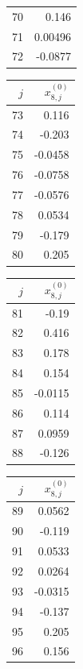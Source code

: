 {\begin{tabular}[t]{r|r}
70 & 0.146 \\
71 & 0.00496 \\
72 & -0.0877
\end{tabular}\kern4pt
\begin{tabular}[t]{r|r}
$j$ & $x^{(0)}_{8,j}$ \\\hline
73 & 0.116 \\
74 & -0.203 \\
75 & -0.0458 \\
76 & -0.0758 \\
77 & -0.0576 \\
78 & 0.0534 \\
79 & -0.179 \\
80 & 0.205
\end{tabular}\kern4pt
\begin{tabular}[t]{r|r}
$j$ & $x^{(0)}_{8,j}$ \\\hline
81 & -0.19 \\
82 & 0.416 \\
83 & 0.178 \\
84 & 0.154 \\
85 & -0.0115 \\
86 & 0.114 \\
87 & 0.0959 \\
88 & -0.126
\end{tabular}\kern4pt
\begin{tabular}[t]{r|r}
$j$ & $x^{(0)}_{8,j}$ \\\hline
89 & 0.0562 \\
90 & -0.119 \\
91 & 0.0533 \\
92 & 0.0264 \\
93 & -0.0315 \\
94 & -0.137 \\
95 & 0.205 \\
96 & 0.156
\end{tabular}}

